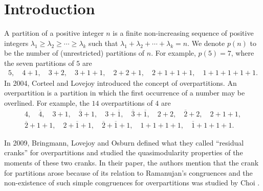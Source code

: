 \documentclass[pdftex]{sigma}
\numberwithin{equation}{section}
\begin{document}
\section{Introduction}\label{section1}

A partition of a positive integer $n$ is a finite non-increasing sequence of positive integers $\lambda_1 \geq \lambda_2 \geq \cdots \geq \lambda_k$ such that $\lambda_1 + \lambda_2 + \cdots + \lambda_k = n$. We denote $p(n)$ to be the number of (unrestricted) partitions of $n$. For example, $p(5) = 7$, where the seven partitions of $5$ are
\begin{align*}
5,\quad 4+1,\quad 3+2,\quad 3+1+1,\quad 2+2+1,\quad 2+1+1+1,\quad 1+1+1+1+1.
\end{align*}
In 2004, Corteel and Lovejoy \cite{Co-Lo} introduced the concept of overpartitions. An overpartition is a partition in which the first occurrence of a number may be overlined.
For example, the $14$ overpartitions of $4$ are
\begin{gather*}
4,\quad  \overline{4},\quad  3 + 1,\quad  \overline{3} + 1,\quad  3 + \overline{1},\quad  \overline{3} + \overline{1},\quad  2 + 2,\quad  \overline{2} + 2,\quad  2 + 1 + 1,
\\
\overline{2} + 1 + 1,\quad  2 + \overline{1} + 1,\quad  \overline{2} + \overline{1} + 1,\quad 1 + 1 + 1 + 1,\quad  \overline{1} + 1 + 1 + 1.
\end{gather*}

In 2009, Bringmann, Lovejoy and Osburn \cite{Br-Lo-Os} defined what they called ``residual cranks'' for overpartitions and studied the quasimodularity properties of the moments of these two cranks. In their paper, the authors mention that the crank for partitions arose because of its relation to Ramanujan's congruences and the non-existence of such simple congruences for overpartitions was studied by Choi \cite{Ch09}.
\end{document}
